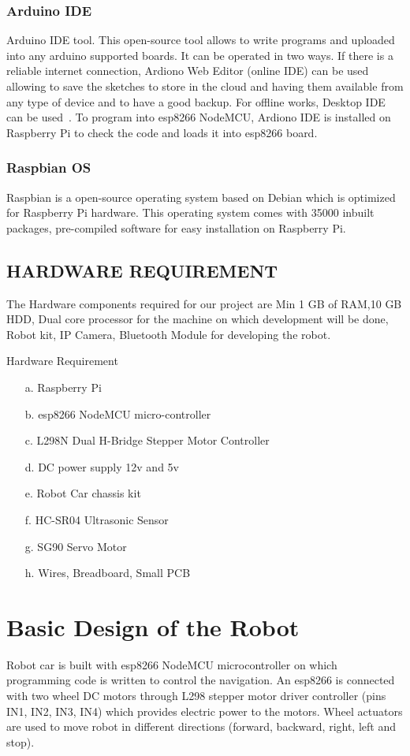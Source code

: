 \subsubsection{Arduino IDE}
Arduino IDE tool. This open-source tool allows to write programs and 
uploaded into any arduino supported boards. It can be operated in two ways. 
If there is a reliable internet connection, Ardiono Web Editor (online IDE) 
can be used allowing to save the sketches to store in the cloud and having 
them available from any type of device and to have a good backup. For 
offline works, Desktop IDE can be used~\cite{arduino2015}. To program into 
esp8266 NodeMCU, Ardiono IDE is installed on Raspberry Pi to check the code 
and loads it into esp8266 board.

\subsubsection{Raspbian OS}
Raspbian is a open-source operating system based on Debian which is 
optimized for Raspberry Pi hardware. This operating system comes with 35000 
inbuilt packages, pre-compiled software for easy installation on Raspberry 
Pi.

\subsection{HARDWARE REQUIREMENT}
The Hardware components required for our project are Min 1 GB of RAM,10 GB 
HDD, Dual core processor for the machine on which development will be done, 
Robot kit, IP Camera, Bluetooth Module for developing the robot.

Hardware Requirement
\begin{itemize}
\item[a.] Raspberry Pi
\item[b.] esp8266 NodeMCU micro-controller
\item[c.] L298N Dual H-Bridge Stepper Motor Controller
\item[d.] DC power supply 12v and 5v
\item[e.] Robot Car chassis kit
\item[f.] HC-SR04 Ultrasonic Sensor
\item[g.] SG90 Servo Motor
\item[h.] Wires, Breadboard, Small PCB
\end{itemize}


\section{Basic Design of the Robot}
Robot car is built with esp8266 NodeMCU microcontroller on which programming 
code is written to control the navigation. An esp8266 is connected with two 
wheel DC motors through L298 stepper motor driver controller (pins IN1, IN2, 
IN3, IN4) which provides electric power to the motors. Wheel actuators are 
used to move robot in different directions (forward, backward, right, left 
and stop).

